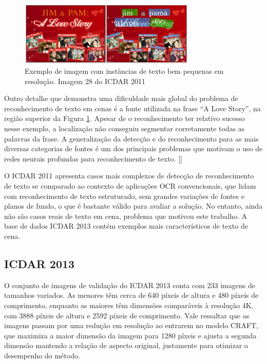 \begin{figure}
    \centering
    \includegraphics[width=0.75\textwidth]{figs/resultados-icdar11-03.png}
    \caption{Exemplo de imagem com instâncias de texto bem pequenas em resolução. Imagem 28 do ICDAR 2011}
    \label{fig:results_icdar11_03}
\end{figure}

Outro detalhe que demonstra uma dificuldade mais global do problema de reconhecimento de texto em cenas é a fonte utilizada 
na frase “A Love Story”, na região superior da Figura \ref{fig:results_icdar11_03}. Apesar de o reconhecimento ter relativo 
sucesso nesse exemplo, a localização não conseguiu segmentar corretamente todas as palavras da frase. A generalização da detecção 
e do reconhecimento para as mais diversas categorias de fontes é um dos principais problemas que motivam o uso de redes neurais 
profundas para reconhecimento de texto. []

O ICDAR 2011 apresenta casos mais complexos de detecção de reconhecimento de texto se comparado ao contexto de aplicações OCR 
convencionais, que lidam com reconhecimento de texto estruturado, sem grandes variações de fontes e planos de fundo, o que é 
bastante válido para avaliar a solução. No entanto, ainda não são casos reais de texto em cena, problema que motivou este trabalho. 
A base de dados ICDAR 2013 contém exemplos mais característicos de texto de cena.


\subsection{ICDAR 2013}\label{sec:results_icdar_2013}

O conjunto de imagens de validação do ICDAR 2013 conta com 233 imagens de tamanhos variados. As menores têm cerca de 640 píxeis 
de altura e 480 píxeis de comprimento, enquanto as maiores têm dimensões comparáveis à resolução 4K, com 3888 píxeis de altura e 
2592 píxeis de comprimento. Vale ressaltar que as imagens passam por uma redução em resolução ao entrarem no modelo CRAFT, que 
maximiza a maior dimensão da imagem para 1280 píxeis e ajusta a segunda dimensão mantendo a relação de aspecto original, justamente 
para otimizar o desempenho do método.

